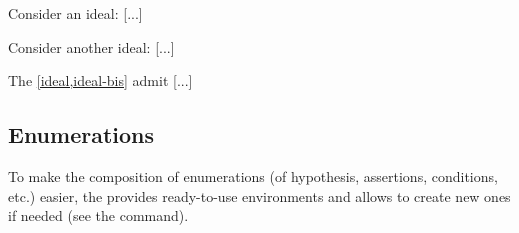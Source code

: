 \documentclass[english,nolocaltoc]{nwejmart}
\newtheorem[style=definition]{fact}
\newtheorem[title=experience]{experience}
\newtheorem[title-plural=rings]{ring}
\newtheorem[title=ideal,title-plural=ideals]{ideal}
\begin{document}
\begin{bodycode}[listing and text,listing options={deletekeywords={[2]label}}]
\begin{ideal}\label{ideal}
Consider an ideal: [...]
\end{ideal}
\begin{ideal}\label{ideal-bis}
Consider another ideal: [...]
\end{ideal}
The \vref{ideal,ideal-bis} admit [...]
\end{bodycode}


\subsection{Enumerations}
\label{sec:list-dhyp-ou}

To make the composition of enumerations (of hypothesis, assertions,
conditions, etc.) easier, the  \nwejmauthorcl{} provides ready-to-use
environments and allows to create new ones if needed (see the 
 command).
\end{document}
